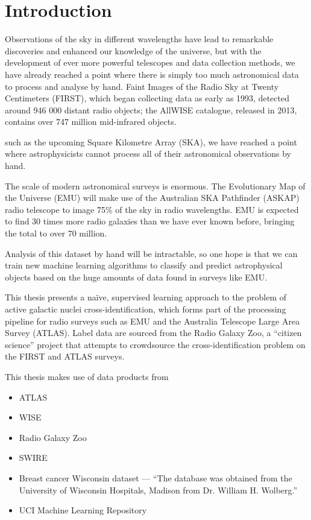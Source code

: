 
\chapter{Introduction}
\label{cha:intro}

Observations of the sky in different wavelengths have lead to remarkable
discoveries and enhanced our knowledge of the universe, but with the development
of ever more powerful telescopes and data collection methods, we have already
reached a point where there is simply too much astronomical data to process and
analyse by hand. Faint Images of the Radio Sky at Twenty Centimeters (FIRST),
which began collecting data as early as 1993, detected around 946 000 distant
radio objects; the AllWISE catalogue, released in 2013, contains over 747
million mid-infrared objects.

such as the upcoming Square Kilometre Array
(SKA), we have reached a point where astrophysicists cannot process all of their
astronomical observations by hand.

The scale of modern astronomical surveys is enormous. The Evolutionary Map of
the Universe (EMU) will make use of the Australian SKA Pathfinder (ASKAP) radio
telescope to image 75\% of the sky in radio wavelengths. EMU is expected to find
30 times more radio galaxies than we have ever known before, bringing the total
to over 70 million.

Analysis of this dataset by hand will be intractable, so one hope is that we can
train new machine learning algorithms to classify and predict astrophysical
objects based on the huge amounts of data found in surveys like EMU.

This thesis presents a na\"ive, supervised learning approach to the problem of
active galactic nuclei cross-identification, which forms part of the processing
pipeline for radio surveys such as EMU and the Australia Telescope Large Area
Survey (ATLAS). Label data are sourced from the Radio Galaxy Zoo, a ``citizen
science'' project that attempts to crowdsource the cross-identification problem
on the FIRST and ATLAS surveys.


This thesis makes use of data products from
\begin{itemize}
    \item ATLAS
    \item WISE
    \item Radio Galaxy Zoo
    \item SWIRE
    \item Breast cancer Wisconsin dataset --- ``The database was obtained from the University of Wisconsin Hospitals, Madison from Dr. William H. Wolberg.''
    \item UCI Machine Learning Repository
\end{itemize}


